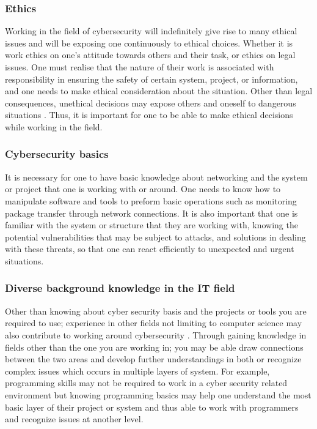\documentclass[a4paper, 11pt]{report}
\begin{document}
\subsubsection{Ethics}
Working in the field of cybersecurity will indefinitely give rise to many ethical issues and will be exposing one continuously to ethical choices. Whether it is work ethics on one’s attitude towards others and their task, or ethics on legal issues. One must realise that the nature of their work is associated with responsibility in ensuring the safety of certain system, project, or information, and one needs to make ethical consideration about the situation. Other than legal consequences, unethical decisions may expose others and oneself to dangerous situations \cite{weber2016cybersecurity}. Thus, it is important for one to be able to make ethical decisions while working in the field.  
\subsubsection{Cybersecurity basics}
It is necessary for one to have basic knowledge about networking and the system or project that one is working with or around. One needs to know how to manipulate software and tools to preform basic operations such as monitoring package transfer through network connections. It is also important that one is familiar with the system or structure that they are working with, knowing the potential vulnerabilities that may be subject to attacks, and solutions in dealing with these threats, so that one can react efficiently to unexpected and urgent situations.  
\subsubsection{Diverse background knowledge in the IT field}
Other than knowing about cyber security basis and the projects or tools you are required to use; experience in other fields not limiting to computer science may also contribute to working around cybersecurity \cite{dawson2018future}. Through gaining knowledge in fields other than the one you are working in; you may be able draw connections between the two areas and develop further understandings in both or recognize complex issues which occurs in multiple layers of system. For example, programming skills may not be required to work in a cyber security related environment but knowing programming basics may help one understand the most basic layer of their project or system and thus able to work with programmers and recognize issues at another level.  
\end{document}
